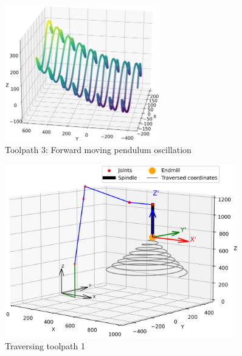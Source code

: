 \begin{figure}[H]%
	\centering
	\includegraphics[width=0.6\textwidth]{figures/path3.png}
	\caption{Toolpath 3: Forward moving pendulum oscillation}
	\label{path3}
\end{figure}







\begin{figure}[H]
	\centerline{\includegraphics[width=0.9\textwidth]{figures/robotANDpath1.png}}
	\caption{Traversing toolpath 1}
	\label{TP1robot}
\end{figure}




